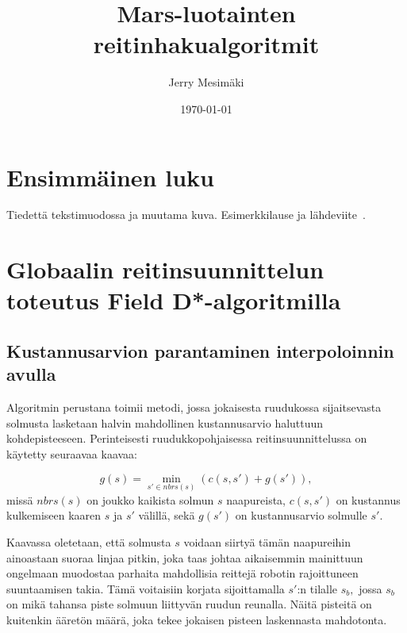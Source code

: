 \documentclass[finnish]{tktltiki2}
\title{Mars-luotainten reitinhakualgoritmit}
\author{Jerry Mesimäki}
\date{\today}
\theoremstyle{definition}
\theoremstyle{remark}
\begin{document}

\frontmatter      %

\maketitle        %
\makeabstract     %

\tableofcontents  %


\mainmatter       %

\section{Ensimmäinen luku}
Tiedettä tekstimuodossa ja muutama kuva.\newline
Esimerkkilause ja lähdeviite~\cite{esimerkki2}.

\section{Globaalin reitinsuunnittelun toteutus Field D*-algoritmilla}

\subsection{Kustannusarvion parantaminen interpoloinnin avulla}
Algoritmin perustana toimii metodi, jossa jokaisesta ruudukossa sijaitsevasta solmusta lasketaan halvin mahdollinen kustannusarvio haluttuun kohdepisteeseen. Perinteisesti ruudukkopohjaisessa reitinsuunnittelussa on käytetty seuraavaa kaavaa:

\[g(s) = \min_{s'\in nbrs(s)} (c(s, s') +g(s')),\]
missä \(nbrs(s)\) on joukko kaikista solmun \(s\) naapureista, \(c(s,s')\) on kustannus kulkemiseen kaaren \(s\) ja \(s'\) välillä, sekä \(g(s')\) on kustannusarvio solmulle \(s'\).

Kaavassa oletetaan, että solmusta \(s\) voidaan siirtyä tämän naapureihin ainoastaan suoraa linjaa pitkin, joka taas johtaa aikaisemmin mainittuun ongelmaan muodostaa parhaita mahdollisia reittejä robotin rajoittuneen suuntaamisen takia. Tämä voitaisiin korjata sijoittamalla \(s'\):n tilalle \(s_b,\) jossa \(s_b\) on mikä tahansa piste solmuun liittyvän ruudun reunalla. Näitä pisteitä on kuitenkin ääretön määrä, joka tekee jokaisen pisteen laskennasta mahdotonta.
\end{document}
